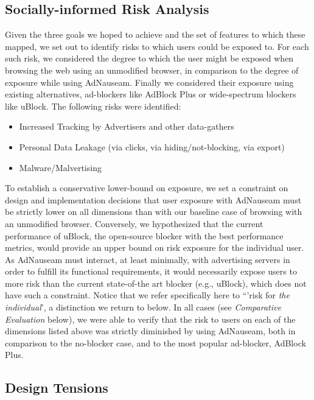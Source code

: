\documentclass[conference]{IEEEtran}
\begin{document}
\subsection{Socially-informed Risk Analysis}

Given the three goals we hoped to achieve and the set of features to which these mapped, we set out to identify risks to which users could be exposed to. For each such risk, we considered the degree to which the user might be exposed when browsing the web using an unmodified browser, in comparison to the degree of exposure while using AdNauseam. Finally we considered their exposure using existing alternatives, ad-blockers like AdBlock Plus\cite{AdBlock} or wide-spectrum blockers like uBlock\cite{Gorhill}. The following risks were identified:

\begin{itemize}
  \item Increased Tracking by Advertisers and other data-gathers
  \item Personal Data Leakage (via clicks, via hiding/not-blocking, via export)
  \item Malware/Malvertising
\end{itemize}

To establish a conservative lower-bound on exposure, we set a constraint on design and implementation decisions that user exposure with AdNauseam must be strictly lower on all dimensions than with our baseline case of browsing with an unmodified browser. Conversely, we hypothesized that the current performance of uBlock, the open-source blocker with the best performance metrics, would provide an upper bound on risk exposure for the individual user. As AdNauseam must interact, at least minimally, with advertising servers in order to fulfill its functional requirements, it would necessarily expose users to more risk than the current state-of-the art blocker (e.g., uBlock), which does not have such a constraint. Notice that we refer specifically here to “'risk for \emph{the individual}', a distinction we return to below. In all cases (see \emph{Comparative Evaluation} below), we were able to verify that the risk to users on each of the dimensions listed above was strictly diminished by using AdNauseam, both in comparison to the no-blocker case, and to the most popular ad-blocker, AdBlock Plus\cite{PageFair}.

\subsection{Design Tensions}
\end{document}
